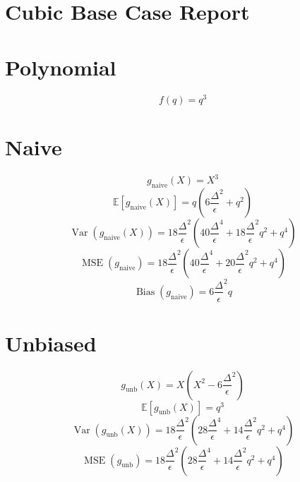 \documentclass{article}
\begin{document}
\section*{Cubic Base Case Report}
\section*{Polynomial}
\begin{dmath*}
f(q) = q^{3}
\end{dmath*}
\section*{Naive}
\begin{dmath*}
g_{\mathrm{naive}}(X) = X^{3}
\end{dmath*}
\begin{dmath*}
\mathbb{E}[g_{\mathrm{naive}}(X)] = q \left(6 {\frac{\Delta}{\epsilon}}^{2} + q^{2}\right)
\end{dmath*}
\begin{dmath*}
\operatorname{Var}(g_{\mathrm{naive}}(X)) = 18 {\frac{\Delta}{\epsilon}}^{2} \left(40 {\frac{\Delta}{\epsilon}}^{4} + 18 {\frac{\Delta}{\epsilon}}^{2} q^{2} + q^{4}\right)
\end{dmath*}
\begin{dmath*}
\operatorname{MSE}(g_{\mathrm{naive}}) = 18 {\frac{\Delta}{\epsilon}}^{2} \left(40 {\frac{\Delta}{\epsilon}}^{4} + 20 {\frac{\Delta}{\epsilon}}^{2} q^{2} + q^{4}\right)
\end{dmath*}
\begin{dmath*}
\operatorname{Bias}(g_{\mathrm{naive}}) = 6 {\frac{\Delta}{\epsilon}}^{2} q
\end{dmath*}
\section*{Unbiased}
\begin{dmath*}
g_{\mathrm{unb}}(X) = X \left(X^{2} - 6 {\frac{\Delta}{\epsilon}}^{2}\right)
\end{dmath*}
\begin{dmath*}
\mathbb{E}[g_{\mathrm{unb}}(X)] = q^{3}
\end{dmath*}
\begin{dmath*}
\operatorname{Var}(g_{\mathrm{unb}}(X)) = 18 {\frac{\Delta}{\epsilon}}^{2} \left(28 {\frac{\Delta}{\epsilon}}^{4} + 14 {\frac{\Delta}{\epsilon}}^{2} q^{2} + q^{4}\right)
\end{dmath*}
\begin{dmath*}
\operatorname{MSE}(g_{\mathrm{unb}}) = 18 {\frac{\Delta}{\epsilon}}^{2} \left(28 {\frac{\Delta}{\epsilon}}^{4} + 14 {\frac{\Delta}{\epsilon}}^{2} q^{2} + q^{4}\right)
\end{dmath*}
\end{document}
